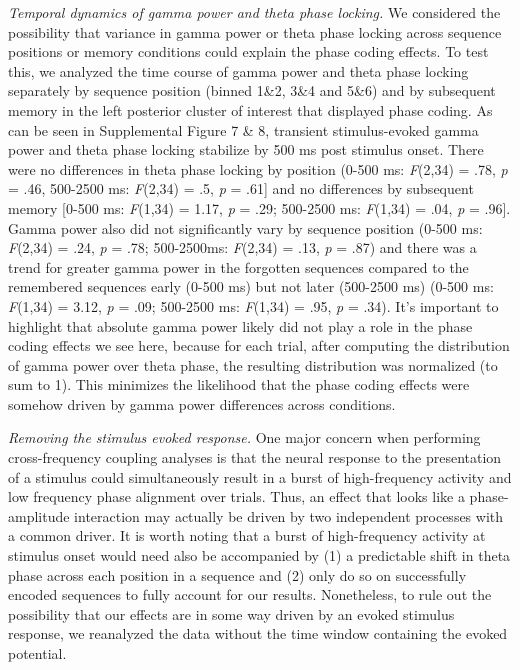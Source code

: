 \emph{Temporal dynamics of gamma power and theta phase locking.} We
considered the possibility that variance in gamma power or theta phase
locking across sequence positions or memory conditions could explain the
phase coding effects. To test this, we analyzed the time course of gamma
power and theta phase locking separately by sequence position (binned
1\&2, 3\&4 and 5\&6) and by subsequent memory in the left posterior
cluster of interest that displayed phase coding. As can be seen in
Supplemental Figure 7 \& 8, transient stimulus-evoked gamma power and
theta phase locking stabilize by 500 ms post stimulus onset. There were
no differences in theta phase locking by position (0-500 ms:
\emph{F}(2,34) = .78, \emph{p} = .46, 500-2500 ms: \emph{F}(2,34) = .5,
\emph{p} = .61{]} and no differences by subsequent memory {[}0-500 ms:
\emph{F}(1,34) = 1.17, \emph{p} = .29; 500-2500 ms: \emph{F}(1,34) =
.04, \emph{p} = .96{]}. Gamma power also did not significantly vary by
sequence position (0-500 ms: \emph{F}(2,34) = .24, \emph{p} = .78;
500-2500ms: \emph{F}(2,34) = .13, \emph{p} = .87) and there was a trend
for greater gamma power in the forgotten sequences compared to the
remembered sequences early (0-500 ms) but not later (500-2500 ms) (0-500
ms: \emph{F}(1,34) = 3.12, \emph{p} = .09; 500-2500 ms: \emph{F}(1,34) =
.95, \emph{p} = .34). It's important to highlight that absolute gamma
power likely did not play a role in the phase coding effects we see
here, because for each trial, after computing the distribution of gamma
power over theta phase, the resulting distribution was normalized (to
sum to 1). This minimizes the likelihood that the phase coding effects
were somehow driven by gamma power differences across conditions.

\emph{Removing the stimulus evoked response.} One major concern when
performing cross-frequency coupling analyses is that the neural response
to the presentation of a stimulus could simultaneously result in a burst
of high-frequency activity and low frequency phase alignment over
trials. Thus, an effect that looks like a phase-amplitude interaction
may actually be driven by two independent processes with a common
driver. It is worth noting that a burst of high-frequency activity at
stimulus onset would need also be accompanied by (1) a predictable shift
in theta phase across each position in a sequence and (2) only do so on
successfully encoded sequences to fully account for our results.
Nonetheless, to rule out the possibility that our effects are in some
way driven by an evoked stimulus response, we reanalyzed the data
without the time window containing the evoked potential.

